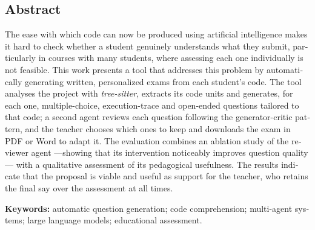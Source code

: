 \begin{otherlanguage}{english}
\chapter*{Abstract}

\noindent The ease with which code can now be produced using artificial
intelligence makes it hard to check whether a student genuinely understands what
they submit, particularly in courses with many students, where assessing each
one individually is not feasible. This work presents a tool that addresses this
problem by automatically generating written, personalized exams from each
student's code. The tool analyses the project with \emph{tree-sitter}, extracts
its code units and generates, for each one, multiple-choice, execution-trace and
open-ended questions tailored to that code; a second agent reviews each question
following the generator-critic pattern, and the teacher chooses which ones to
keep and downloads the exam in PDF or Word to adapt it. The evaluation combines
an ablation study of the reviewer agent ---showing that its intervention
noticeably improves question quality--- with a qualitative assessment of its
pedagogical usefulness. The results indicate that the proposal is viable and
useful as support for the teacher, who retains the final say over the
assessment at all times.

\vspace{1em}
\noindent\textbf{Keywords:} automatic question generation; code comprehension;
multi-agent systems; large language models; educational assessment.

\end{otherlanguage}

\cleardoublepage
